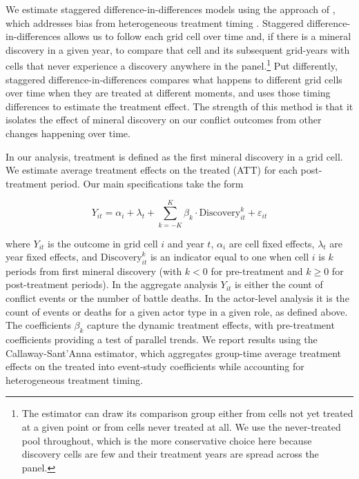 \documentclass[11pt]{article}
\begin{document}
We estimate staggered difference-in-differences models using the approach of \citet{callaway2021difference}, which addresses bias from heterogeneous treatment timing \citep[see also][]{goodman2021difference, sun2021estimating}. Staggered difference-in-differences allows us to follow each grid cell over time and, if there is a mineral discovery in a given year, to compare that cell and its subsequent grid-years with cells that never experience a discovery anywhere in the panel.\footnote{The estimator can draw its comparison group either from cells not yet treated at a given point or from cells never treated at all. We use the never-treated pool throughout, which is the more conservative choice here because discovery cells are few and their treatment years are spread across the panel.} Put differently, staggered difference-in-differences compares what happens to different grid cells over time when they are treated at different moments, and uses those timing differences to estimate the treatment effect. The strength of this method is that it isolates the effect of mineral discovery on our conflict outcomes from other changes happening over time.

In our analysis, treatment is defined as the first mineral discovery in a grid cell. We estimate average treatment effects on the treated (ATT) for each post-treatment period. Our main specifications take the form

\begin{equation}
Y_{it} = \alpha_i + \lambda_t + \sum_{k=-K}^{K} \beta_k \cdot \text{Discovery}_{it}^k + \varepsilon_{it}
\end{equation}

\noindent where $Y_{it}$ is the outcome in grid cell $i$ and year $t$, $\alpha_i$ are cell fixed effects, $\lambda_t$ are year fixed effects, and $\text{Discovery}_{it}^k$ is an indicator equal to one when cell $i$ is $k$ periods from first mineral discovery (with $k < 0$ for pre-treatment and $k \geq 0$ for post-treatment periods). In the aggregate analysis $Y_{it}$ is either the count of conflict events or the number of battle deaths. In the actor-level analysis it is the count of events or deaths for a given actor type in a given role, as defined above. The coefficients $\beta_k$ capture the dynamic treatment effects, with pre-treatment coefficients providing a test of parallel trends. We report results using the Callaway-Sant'Anna estimator, which aggregates group-time average treatment effects on the treated into event-study coefficients while accounting for heterogeneous treatment timing.
\end{document}
